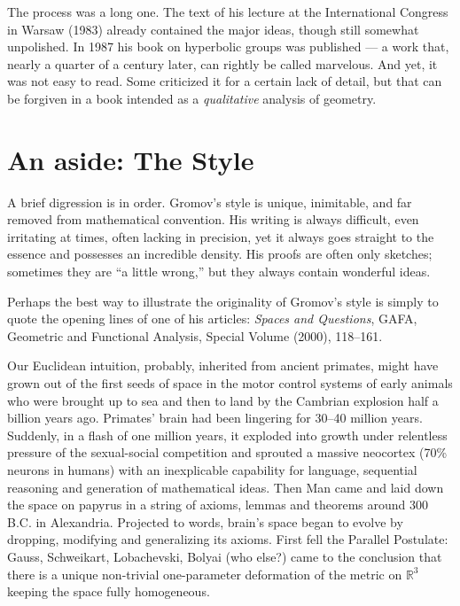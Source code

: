 \documentclass{amsart}
\begin{document}
The process was a long one. The text of his lecture%
at the International Congress in Warsaw (1983)%
already contained the major ideas, though still somewhat
unpolished. In 1987 his book on hyperbolic groups%
was published --- a work that, nearly a quarter of a century later,
can rightly be called marvelous. And yet, it was not easy to
read. Some criticized it for a certain lack of detail, but that can be
forgiven in a book intended as a \textit{qualitative} analysis of
geometry.

\section{An aside: The Style}

A brief digression is in order. Gromov’s style is unique, inimitable, and
far removed from mathematical convention. His writing is always
difficult, even irritating at times, often lacking in precision, yet
it always goes straight to the essence and possesses an incredible
density. His proofs are often only sketches; sometimes they are ``a little
wrong,'' but they always contain wonderful ideas.

Perhaps the best way to illustrate the originality of Gromov’s style
is simply to quote the opening lines of one of his articles:
\textit{Spaces and Questions}, GAFA, Geometric and Functional
Analysis, Special Volume (2000), 118--161.

\begin{quoting}[leftmargin=5mm,rightmargin=5mm]\sf
  Our Euclidean intuition, probably, inherited from ancient primates,
  might have grown out of the first seeds of space in the motor
  control systems of early animals who were brought up to sea and then
  to land by the Cambrian explosion half a billion years
  ago. Primates’ brain had been lingering for 30--40 million years.
  Suddenly, in a flash of one million years, it exploded into growth
  under relentless pressure of the sexual-social competition and
  sprouted a massive neocortex (70\% neurons in humans) with an
  inexplicable capability for language, sequential reasoning and
  generation of mathematical ideas. Then Man came and laid down the
  space on papyrus in a string of axioms, lemmas and theorems around
  300 B.C. in Alexandria.  Projected to words, brain’s space began to
  evolve by dropping, modifying and generalizing its axioms. First
  fell the Parallel Postulate: Gauss, Schweikart, Lobachevski, Bolyai
  (who else?) came to the conclusion that there is a unique
  non-trivial one-parameter deformation of the metric on
  $\mathbb{R}^{3}$ keeping the space fully homogeneous.
\end{quoting}
\end{document}
